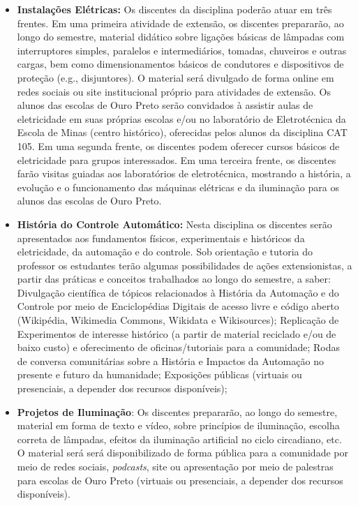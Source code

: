 \documentclass[
	12pt,				%
	openright,			%
	oneside,			%
	a4paper,			%
	english,			%
	brazil				%
	]{abntex2}
\begin{document}
\begin{itemize}
     \item \textbf{Instalações Elétricas:} Os discentes da disciplina poderão atuar em três frentes. Em uma primeira atividade de extensão, os discentes prepararão, ao longo do semestre, material didático sobre ligações básicas de lâmpadas com interruptores simples, paralelos e intermediários, tomadas, chuveiros e outras cargas, bem como dimensionamentos básicos de condutores e dispositivos de proteção (e.g., disjuntores). O material será divulgado de forma online em redes sociais ou site institucional próprio para atividades de extensão. Os alunos das escolas de Ouro Preto serão convidados à assistir aulas de eletricidade em suas próprias escolas e/ou no laboratório de Eletrotécnica da Escola de Minas (centro histórico), oferecidas pelos alunos da disciplina CAT 105. Em uma segunda frente, os discentes podem oferecer cursos básicos de eletricidade para grupos interessados. Em uma terceira frente, os discentes farão visitas guiadas aos laboratórios de eletrotécnica, mostrando a história, a evolução e o funcionamento das máquinas elétricas e da iluminação para os alunos das escolas de Ouro Preto.

    \item \textbf{História do Controle Automático:} Nesta disciplina os discentes serão apresentados aos fundamentos físicos, experimentais e históricos da eletricidade, da automação e do controle. Sob orientação e tutoria do professor os estudantes terão algumas possibilidades de ações extensionistas, a partir das práticas e conceitos trabalhados ao longo do semestre, a saber: Divulgação científica de tópicos relacionados à História da Automação e do Controle por meio de Enciclopédias Digitais de acesso livre e código aberto (Wikipédia, Wikimedia Commons, Wikidata e Wikisources); Replicação de Experimentos de interesse histórico (a partir de material reciclado e/ou de baixo custo) e oferecimento de oficinas/tutoriais para a comunidade; Rodas de conversa comunitárias sobre a História e Impactos da Automação no presente e futuro da humanidade; Exposições públicas (virtuais ou presenciais, a depender dos recursos disponíveis);

    \item \textbf{Projetos de Iluminação}: Os discentes prepararão, ao longo do semestre, material em forma de texto e vídeo, sobre princípios de iluminação, escolha correta de lâmpadas, efeitos da iluminação artificial no ciclo circadiano, etc. O material será será disponibilizado de forma pública para a comunidade por meio de redes sociais, \textit{podcasts}, site ou apresentação por meio de palestras para escolas de Ouro Preto (virtuais ou presenciais, a depender dos recursos disponíveis).
\end{itemize}
\end{document}

